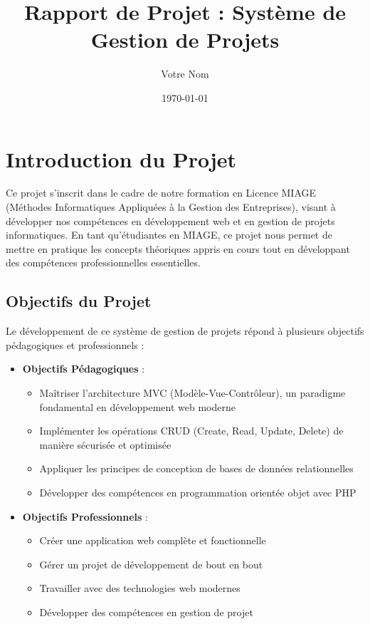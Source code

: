 \documentclass[12pt,a4paper]{article}
\title{Rapport de Projet : Système de Gestion de Projets}
\author{Votre Nom}
\date{\today}
\begin{document}
\maketitle
\tableofcontents
\newpage

\section{Introduction du Projet}
Ce projet s'inscrit dans le cadre de notre formation en Licence MIAGE (Méthodes Informatiques Appliquées à la Gestion des Entreprises), visant à développer nos compétences en développement web et en gestion de projets informatiques. En tant qu'étudiantes en MIAGE, ce projet nous permet de mettre en pratique les concepts théoriques appris en cours tout en développant des compétences professionnelles essentielles.

\subsection{Objectifs du Projet}
Le développement de ce système de gestion de projets répond à plusieurs objectifs pédagogiques et professionnels :

\begin{itemize}
    \item \textbf{Objectifs Pédagogiques} :
    \begin{itemize}
        \item Maîtriser l'architecture MVC (Modèle-Vue-Contrôleur), un paradigme fondamental en développement web moderne
        \item Implémenter les opérations CRUD (Create, Read, Update, Delete) de manière sécurisée et optimisée
        \item Appliquer les principes de conception de bases de données relationnelles
        \item Développer des compétences en programmation orientée objet avec PHP
    \end{itemize}

    \item \textbf{Objectifs Professionnels} :
    \begin{itemize}
        \item Créer une application web complète et fonctionnelle
        \item Gérer un projet de développement de bout en bout
        \item Travailler avec des technologies web modernes
        \item Développer des compétences en gestion de projet
    \end{itemize}
\end{itemize}
\end{document}
